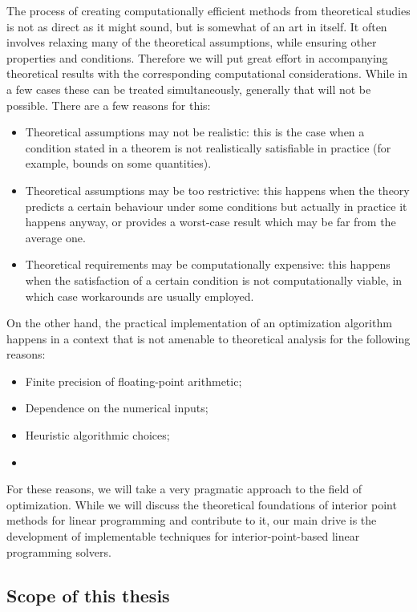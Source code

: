The process of creating computationally efficient methods from
theoretical studies is not as direct as it might sound, but is somewhat
of an art in itself. It often involves relaxing many of the theoretical 
assumptions, while ensuring other properties and conditions.
Therefore we will put great effort in accompanying theoretical
results with the corresponding computational considerations. While
in a few cases these can be treated simultaneously, generally that
will not be possible. There are a few reasons for this:
\begin{itemize}
\item Theoretical assumptions may not be realistic: this is the case
when a condition stated in a theorem is not realistically satisfiable 
in practice (for example, bounds on some quantities). 
\item Theoretical assumptions may be too restrictive: this happens
when the theory predicts a certain behaviour under some conditions
but actually in practice it happens anyway, or provides a worst-case 
result which may be far from the average one.
\item Theoretical requirements may be computationally expensive: this 
happens when the satisfaction of a certain condition is not 
computationally viable, in which case workarounds are usually employed.
\end{itemize}

On the other hand, the practical implementation of an optimization
algorithm happens in a context that is not amenable to theoretical 
analysis for the following reasons:
\begin{itemize}
\item Finite precision of floating-point arithmetic;
\item Dependence on the numerical inputs;
\item Heuristic algorithmic choices;
\item 
\end{itemize}

For these reasons, we will take a very pragmatic approach to the
field of optimization. While we will discuss the theoretical foundations
of interior point methods for linear programming and contribute to
it, our main drive is the development of implementable techniques
for interior-point-based linear programming solvers.


%
%
\subsection{Scope of this thesis}

